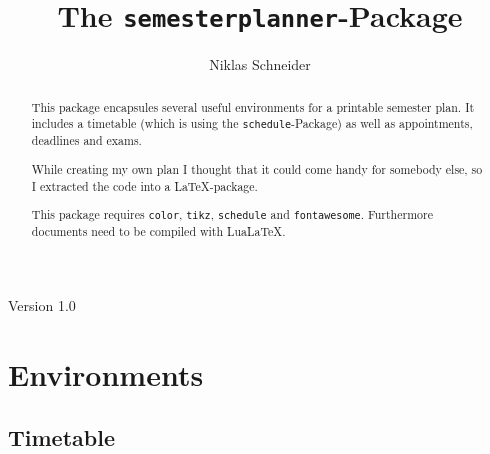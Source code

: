 \documentclass[english]{article}
\title{The \texttt{semesterplanner}-Package}
\author{Niklas Schneider}
\begin{document}
	\maketitle
	\begin{center}
		Version 1.0\\
	\end{center}

	\begin{abstract}
		This package encapsules several useful environments for a printable semester plan. It includes a timetable (which is using the \texttt{schedule}-Package) as well as appointments, deadlines and exams.
		
		While creating my own plan I thought that it could come handy for somebody else, so I extracted the code into a \LaTeX-package.
		
		This package requires \texttt{color}, \texttt{tikz}, \texttt{schedule} and \texttt{fontawesome}. Furthermore documents need to be compiled with LuaLaTeX.
	\end{abstract}

	\tableofcontents
	\pagebreak
	
	\section{Environments}
	\subsection{Timetable}
	\label{timetable}
\end{document}
